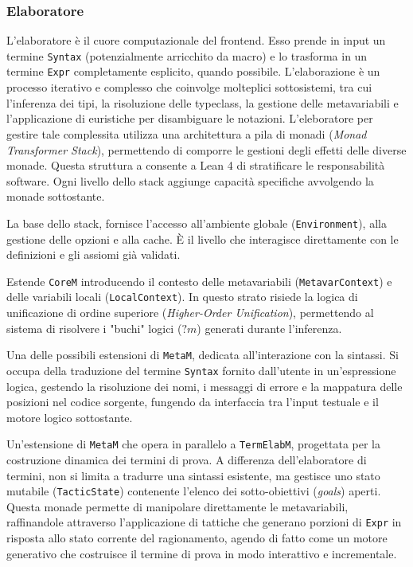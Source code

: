 \subsubsection{Elaboratore}
L'elaboratore è il cuore computazionale del frontend. Esso prende in input un termine \texttt{Syntax} (potenzialmente arricchito da macro) e lo trasforma in un termine 
\texttt{Expr} completamente esplicito, quando possibile. L'elaborazione è un processo iterativo e complesso che coinvolge molteplici sottosistemi, tra cui l'inferenza dei 
tipi, la risoluzione delle typeclass, la gestione delle metavariabili e l'applicazione di euristiche per disambiguare le notazioni. L'eleboratore per gestire tale complessita 
utilizza una architettura a pila di monadi (\emph{Monad Transformer Stack}), permettendo di comporre le gestioni degli effetti delle diverse monade. Questa struttura a consente 
a Lean 4 di stratificare le responsabilità software. Ogni livello dello stack aggiunge capacità specifiche avvolgendo la monade sottostante.
\begin{description}[leftmargin=1.5em, style=nextline, font=\bfseries]
    \item [\texttt{CoreM}] 
        La base dello stack, fornisce l'accesso all'ambiente globale (\texttt{Environment}), alla gestione delle opzioni e alla cache. È il livello che interagisce 
        direttamente con le definizioni e gli assiomi già validati.
    \item [\texttt{MetaM}]
        Estende \texttt{CoreM} introducendo il contesto delle metavariabili (\texttt{MetavarContext}) e delle variabili locali (\texttt{LocalContext}). In questo 
        strato risiede la logica di unificazione di ordine superiore (\emph{Higher-Order Unification}), permettendo al sistema di risolvere i "buchi" logici ($?m$) 
        generati durante l'inferenza.
    \item [\texttt{TermElabM}]
        Una delle possibili estensioni di \texttt{MetaM}, dedicata all'interazione con la sintassi. Si occupa della traduzione del termine \texttt{Syntax} fornito 
        dall'utente in un'espressione logica, gestendo la risoluzione dei nomi, i messaggi di errore e la mappatura delle posizioni nel codice sorgente, fungendo da 
        interfaccia tra l'input testuale e il motore logico sottostante.
    \item [\texttt{TacticM}]
        Un'estensione di \texttt{MetaM} che opera in parallelo a \texttt{TermElabM}, progettata per la costruzione dinamica dei termini di prova. A differenza dell'elaboratore 
        di termini, non si limita a tradurre una sintassi esistente, ma gestisce uno stato mutabile (\texttt{TacticState}) contenente l'elenco dei sotto-obiettivi (\emph{goals}) 
        aperti. Questa monade permette di manipolare direttamente le metavariabili, raffinandole attraverso l'applicazione di tattiche che generano porzioni di \texttt{Expr} in 
        risposta allo stato corrente del ragionamento, agendo di fatto come un motore generativo che costruisce il termine di prova in modo interattivo e incrementale.
\end{description}


